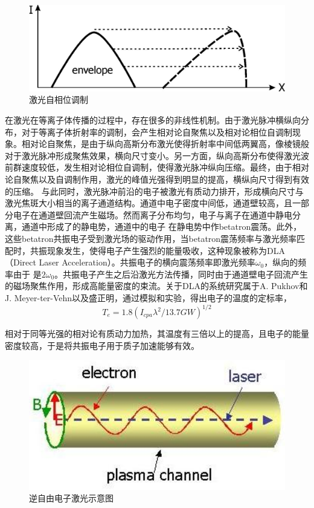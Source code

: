 \begin{figure}[!htbp]
  \centering
  \includegraphics[width=\MyFactor\textwidth]{Img/prof-steepening.eps}
  \caption{激光自相位调制}
  \label{fig:phaseModulate}
\end{figure}




在激光在等离子体传播的过程中，存在很多的非线性机制。由于激光脉冲横纵向分布，对于等离子体折射率的调制，会产生相对论自聚焦以及相对论相位自调制现象。相对论自聚焦，是由于纵向高斯分布激光使得折射率中间低两翼高，像棱镜般对于激光脉冲形成聚焦效果，横向尺寸变小。另一方面，纵向高斯分布使得激光波前群速度较低，发生相对论相位自调制，使得激光脉冲纵向压缩。最终，由于相对论自聚焦以及自调制作用，激光的峰值光强得到明显的提高，横纵向尺寸得到有效的压缩\cite{wang2011laser}。
与此同时，激光脉冲前沿的电子被激光有质动力排开，形成横向尺寸与激光焦斑大小相当的离子通道结构。通道中电子密度中间低，通道壁较高，且一部分电子在通道壁回流产生磁场。然而离子分布均匀，电子与离子在通道中静电分离，通道中形成了的静电势，通道中的电子  在静电势中作betatron震荡。此外，这些betatron共振电子受到激光场的驱动作用，当betatron震荡频率与激光频率匹配时，共振现象发生，使得电子产生强烈的能量吸收，这种现象被称为DLA（Direct Laser Acceleration）。共振电子的横向震荡频率即激光频率$\omega_0$，纵向的频率由于  是$2 \omega_0$。共振电子产生之后沿激光方法传播，同时由于通道壁电子回流产生的磁场聚焦作用，形成高能量密度的束流。关于DLA的系统研究属于A. Pukhov和J. Meyer-ter-Vehn以及盛正明\cite{pukhov1998relativistic,pukhov1999particle}，通过模拟和实验，得出电子的温度的定标率，
\begin{equation}
\label{eqn:DLAtemperature}
T_e = 1.8(I_{cpa} {\lambda}^2/{13.7}GW)^{1/2}
\end{equation} 

相对于同等光强的相对论有质动力加热，其温度有三倍以上的提高，且电子的能量密度较高，于是将共振电子用于质子加速能够有效。

\begin{figure}[!htbp]
  \centering
  \includegraphics[width=\MyFactor\textwidth]{Img/IFEL.eps}
  \caption{逆自由电子激光示意图}
  \label{fig:IFEL}
\end{figure}

